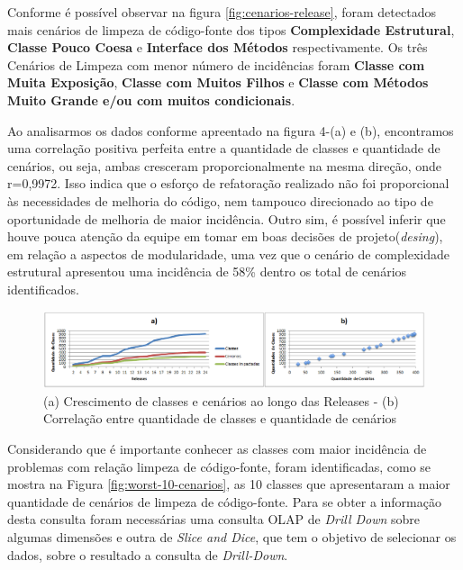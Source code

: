 Conforme é possível observar na figura \ref{fig:cenarios-release}, foram detectados mais cenários de limpeza de código-fonte dos tipos \textbf{Complexidade Estrutural}, \textbf{Classe Pouco Coesa} e \textbf{Interface dos Métodos} respectivamente. Os três Cenários de Limpeza com menor número de incidências foram \textbf{Classe com Muita Exposição}, \textbf{Classe com Muitos Filhos} e \textbf{Classe com Métodos Muito Grande e/ou com muitos condicionais}.

Ao analisarmos os dados conforme apreentado na figura 4-(a) e (b), encontramos uma correlação positiva perfeita entre a quantidade de classes e quantidade de cenários, ou seja, ambas cresceram proporcionalmente na mesma direção, onde r=0,9972. Isso indica que o esforço de refatoração realizado não foi proporcional às necessidades de melhoria do código, nem tampouco direcionado ao tipo de oportunidade de melhoria de maior incidência. Outro sim, é possível inferir que houve pouca atenção da equipe em tomar em boas decisões de projeto(\textit{desing}), em relação a aspectos de modularidade, uma vez que o cenário de complexidade estrutural apresentou uma incidência de 58\% dentro os total de cenários identificados.

\begin{figure}[ht!]
\centering
\includegraphics[keepaspectratio=true,scale=0.5]{figuras/classesXcenarios.eps}
\caption{(a) Crescimento de classes e cenários ao longo das Releases - (b) Correlação entre quantidade de classes e quantidade de cenários}
\label{fig:classes-cenarios}
\end{figure}
\FloatBarrier

Considerando que é importante conhecer as classes com maior incidência de problemas com relação limpeza de código-fonte, foram identificadas, como se mostra na Figura \ref{fig:worst-10-cenarios}, as 10 classes que apresentaram a maior quantidade de cenários de limpeza de código-fonte. Para se obter a informação desta consulta foram necessárias uma consulta OLAP de \textit{Drill Down} sobre algumas dimensões e outra de \textit{Slice and Dice}, que tem o objetivo de selecionar os dados, sobre o resultado a consulta de \textit{Drill-Down}.    


